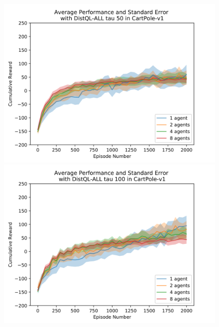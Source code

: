 \documentclass[jair,twoside,11pt,theapa]{article}
\begin{document}
\begin{figure}[h]
	\centering
	\begin{minipage}{.5\textwidth}
		\centering
		\includegraphics[width=1\linewidth]{resultImages/binned-Average-Performance-and-Standard-Error-with-DistQL-ALL-tau-50-in-CartPole-v1}
		\caption{}
		\label{fig:DistQL-ALL-tau-50-env-CartPole-v1}
	\end{minipage}%
	\begin{minipage}{.5\textwidth}
		\centering
		\includegraphics[width=1\linewidth]{resultImages/binned-Average-Performance-and-Standard-Error-with-DistQL-ALL-tau-100-in-CartPole-v1}
		\caption{}
		\label{fig:DistQL-ALL-tau-100-env-CartPole-v1}
	\end{minipage}
\end{figure}
\end{document}
